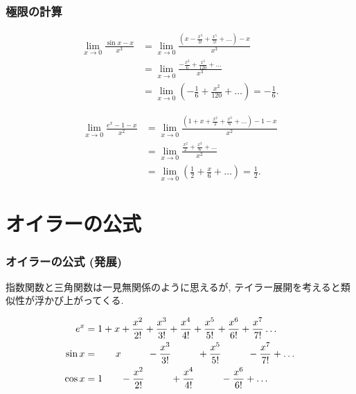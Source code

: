 

\begin{frame}
\frametitle{極限の計算}

\vspace{-5mm}

\begin{align*}
\lim_{x \to 0} \frac{\sin x -x}{x^3} & = \lim_{x \to 0} \frac{(x -\frac{x^3}{3!}+\frac{x^5}{5!}+\dots) -x}{x^3} \\
& =   \lim_{x \to 0} \frac{-\frac{x^3}{6}+\frac{x^5}{120}+\dots}{x^3} \\
& =   \lim_{x \to 0} (-\frac{1}{6}+\frac{x^2}{120}+\dots ) = -\frac{1}{6}. 
\end{align*}

\begin{align*}
\lim_{x \to 0} \frac{e^x-1-x}{x^2} &=  \lim_{x \to 0} \frac{(1+x+\frac{x^2}{2}+\frac{x^3}{6}+\dots )-1-x}{x^2} \\
& = \lim_{x \to 0} \frac{\frac{x^2}{2}+\frac{x^3}{6}+\dots}{x^2} \\
& = \lim_{x \to 0} (\frac{1}{2}+\frac{x}{6}+\dots)= \frac{1}{2}.  
\end{align*}

\end{frame}





\section{オイラーの公式}

\begin{frame}
\frametitle{オイラーの公式 (発展)}

指数関数と三角関数は一見無関係のように思えるが, テイラー展開を考えると類似性が浮かび上がってくる. 

\begin{align*}
e^x & = 1+x+\frac{x^2}{2!}+\frac{x^3}{3!}+\frac{x^4}{4!}+\frac{x^5}{5!}+\frac{x^6}{6!}+\frac{x^7}{7!}\dots \\
\sin x &=   \hspace{6.5mm} x  \hspace{9.5mm}   -\frac{x^3}{3!}  \hspace{9.5mm} +\frac{x^5}{5!} \hspace{9.5mm} -\frac{x^7}{7!} +  \dots  \\
\cos x &= 1   \hspace{6.5mm}  -\frac{x^2}{2!}   \hspace{9.5mm} +\frac{x^4}{4!}   \hspace{9.5mm} -\frac{x^6}{6!} +\dots 
\end{align*}

\end{frame}


